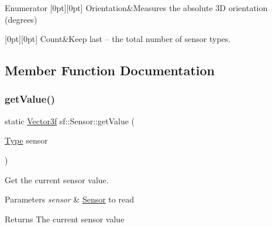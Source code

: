 \begin{DoxyEnumFields}{Enumerator}
[0pt][0pt]{}\mbox{\label{classsf_1_1_sensor_a687375af3ab77b818fca73735bcaea84aa428c5260446555de87c69b65f6edf00}} 
Orientation&Measures the absolute 3D orientation (degrees) \\
\hline

[0pt][0pt]{}\mbox{\label{classsf_1_1_sensor_a687375af3ab77b818fca73735bcaea84afcb4a80eb9e3f927c5837207a1b9eb29}} 
Count&Keep last -- the total number of sensor types. \\
\hline

\end{DoxyEnumFields}


\subsection{Member Function Documentation}
\mbox{\label{classsf_1_1_sensor_ab9a2710f55ead2f7b4e1b0bead34457e}} 
\subsubsection{\texorpdfstring{getValue()}{getValue()}}
{\footnotesize\ttfamily static \mbox{\hyperlink{classsf_1_1_vector3}{Vector3f}} sf\+::\+Sensor\+::get\+Value (\begin{DoxyParamCaption}\item[{\mbox{\hyperlink{classsf_1_1_sensor_a687375af3ab77b818fca73735bcaea84}{Type}}}]{sensor }\end{DoxyParamCaption})\hspace{0.3cm}{\ttfamily [static]}}



Get the current sensor value. 


\begin{DoxyParams}{Parameters}
{\em sensor} & \mbox{\hyperlink{classsf_1_1_sensor}{Sensor}} to read\\
\hline
\end{DoxyParams}
\begin{DoxyReturn}{Returns}
The current sensor value \begin{DoxyVerb}\end{DoxyVerb}
 
\end{DoxyReturn}
\mbox{\label{classsf_1_1_sensor_a7b7a2570218221781233bd495323abf0}} 
